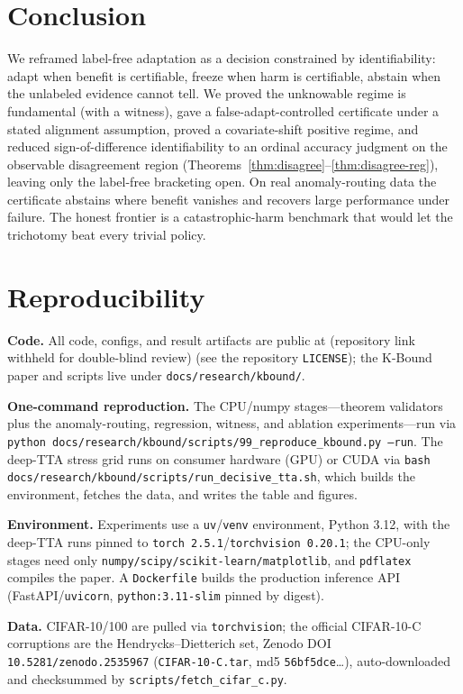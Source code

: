 \documentclass[11pt]{article}
\theoremstyle{plain}
\theoremstyle{definition}
\begin{document}
\section{Conclusion}
We reframed label-free adaptation as a decision constrained by identifiability: adapt
when benefit is certifiable, freeze when harm is certifiable, abstain when the
unlabeled evidence cannot tell. We proved the unknowable regime is fundamental (with a
witness), gave a false-adapt-controlled certificate under a stated alignment
assumption, proved a covariate-shift positive regime, and reduced sign-of-difference
identifiability to an ordinal accuracy judgment on the observable disagreement region
(Theorems~\ref{thm:disagree}--\ref{thm:disagree-reg}), leaving only the label-free bracketing open. On real
anomaly-routing data the certificate abstains where benefit vanishes and recovers large
performance under failure. The honest frontier is a catastrophic-harm benchmark that
would let the trichotomy beat every trivial policy.

\section{Reproducibility}\label{sec:repro}
\textbf{Code.} All code, configs, and result artifacts are public at
(repository link withheld for double-blind review) (see the repository \texttt{LICENSE}); the
K-Bound paper and scripts live under \texttt{docs/research/kbound/}.

\noindent\textbf{One-command reproduction.} The CPU/numpy stages---theorem validators plus the
anomaly-routing, regression, witness, and ablation experiments---run via
\texttt{python docs/research/kbound/scripts/99\_reproduce\_kbound.py --run}. The deep-TTA stress
grid runs on consumer hardware (GPU) or CUDA via
\texttt{bash docs/research/kbound/scripts/run\_decisive\_tta.sh}, which builds the environment,
fetches the data, and writes the table and figures.

\noindent\textbf{Environment.} Experiments use a \texttt{uv}/\texttt{venv} environment, Python
3.12, with the deep-TTA runs pinned to \texttt{torch 2.5.1}/\texttt{torchvision 0.20.1}; the
CPU-only stages need only \texttt{numpy/scipy/scikit-learn/matplotlib}, and \texttt{pdflatex}
compiles the paper. A \texttt{Dockerfile} builds the production inference API
(FastAPI/\texttt{uvicorn}, \texttt{python:3.11-slim} pinned by digest).

\noindent\textbf{Data.} CIFAR-10/100 are pulled via \texttt{torchvision}; the official CIFAR-10-C
corruptions are the Hendrycks--Dietterich set, Zenodo DOI \texttt{10.5281/zenodo.2535967}
(\texttt{CIFAR-10-C.tar}, md5 \texttt{56bf5dce}\dots), auto-downloaded and checksummed by
\texttt{scripts/fetch\_cifar\_c.py}.
\end{document}
